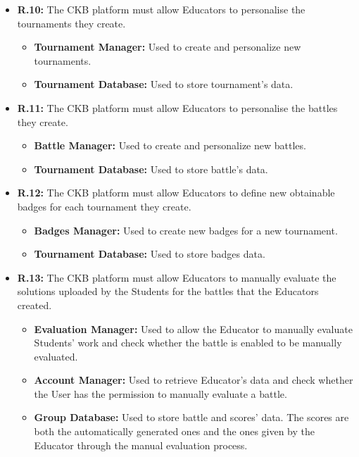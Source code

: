 \documentclass{article}
\begin{document}
{\begin{itemize}
\begin{itemize}
          \end{itemize}
    \item \textbf{R.10:} The CKB platform must allow Educators to personalise the tournaments they create.
          \begin{itemize}
              \item \textbf{Tournament Manager:} Used to create and personalize new tournaments.
              \item \textbf{Tournament Database:} Used to store tournament's data.
          \end{itemize}
    \item \textbf{R.11:} The CKB platform must allow Educators to personalise the battles they create.
          \begin{itemize}
              \item \textbf{Battle Manager:} Used to create and personalize new battles.
              \item \textbf{Tournament Database:} Used to store battle's data.
          \end{itemize}
    \item \textbf{R.12:} The CKB platform must allow Educators to define new obtainable badges for each tournament they
          create.
          \begin{itemize}
              \item \textbf{Badges Manager:} Used to create new badges for a new tournament.
              \item \textbf{Tournament Database:} Used to store badges data.
          \end{itemize}
    \item \textbf{R.13:} The CKB platform must allow Educators to manually evaluate the solutions uploaded by the Students for the battles that
          the Educators created.
          \begin{itemize}
              \item \textbf{Evaluation Manager:} Used to allow the Educator to manually evaluate Students'
              work and check whether the battle is enabled to be manually evaluated.
              \item \textbf{Account Manager:} Used to retrieve Educator's data and check whether
              the User has the permission to manually evaluate a battle.
              \item \textbf{Group Database:} Used to store battle and scores' data. The scores are both the automatically generated ones and the ones
              given by the Educator through the manual evaluation process.  

\end{itemize}
\end{itemize}}
\end{document}
